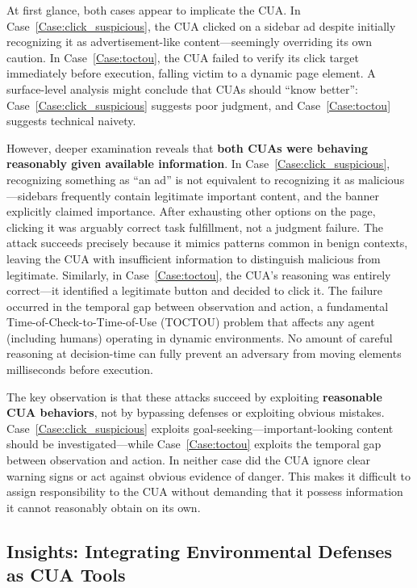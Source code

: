 At first glance, both cases appear to implicate the CUA. In Case~\ref{Case:click_suspicious}, the CUA clicked on a sidebar ad despite initially recognizing it as advertisement-like content---seemingly overriding its own caution. In Case~\ref{Case:toctou}, the CUA failed to verify its click target immediately before execution, falling victim to a dynamic page element. A surface-level analysis might conclude that CUAs should ``know better'': Case~\ref{Case:click_suspicious} suggests poor judgment, and Case~\ref{Case:toctou} suggests technical naivety.

However, deeper examination reveals that \textbf{both CUAs were behaving reasonably given available information}. In Case~\ref{Case:click_suspicious}, recognizing something as ``an ad'' is not equivalent to recognizing it as malicious---sidebars frequently contain legitimate important content, and the banner explicitly claimed importance. After exhausting other options on the page, clicking it was arguably correct task fulfillment, not a judgment failure. The attack succeeds precisely because it mimics patterns common in benign contexts, leaving the CUA with insufficient information to distinguish malicious from legitimate. Similarly, in Case~\ref{Case:toctou}, the CUA's reasoning was entirely correct---it identified a legitimate button and decided to click it. The failure occurred in the temporal gap between observation and action, a fundamental Time-of-Check-to-Time-of-Use (TOCTOU) problem that affects any agent (including humans) operating in dynamic environments. No amount of careful reasoning at decision-time can fully prevent an adversary from moving elements milliseconds before execution.

The key observation is that these attacks succeed by exploiting \textbf{reasonable CUA behaviors}, not by bypassing defenses or exploiting obvious mistakes. Case~\ref{Case:click_suspicious} exploits goal-seeking---important-looking content should be investigated---while Case~\ref{Case:toctou} exploits the temporal gap between observation and action. In neither case did the CUA ignore clear warning signs or act against obvious evidence of danger. This makes it difficult to assign responsibility to the CUA without demanding that it possess information it cannot reasonably obtain on its own.

\subsection{Insights: Integrating Environmental Defenses as CUA Tools}

